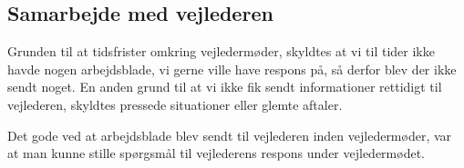 \subsection{Samarbejde med vejlederen}

Grunden til at tidsfrister omkring vejledermøder, skyldtes at vi til tider ikke havde nogen arbejdsblade, vi gerne ville have respons på, så derfor blev der ikke sendt noget. En anden grund til at vi ikke fik sendt informationer rettidigt til vejlederen, skyldtes pressede situationer eller glemte aftaler.

Det gode ved at arbejdsblade blev sendt til vejlederen inden vejledermøder, var at man kunne stille spørgsmål til vejlederens respons under vejledermødet.